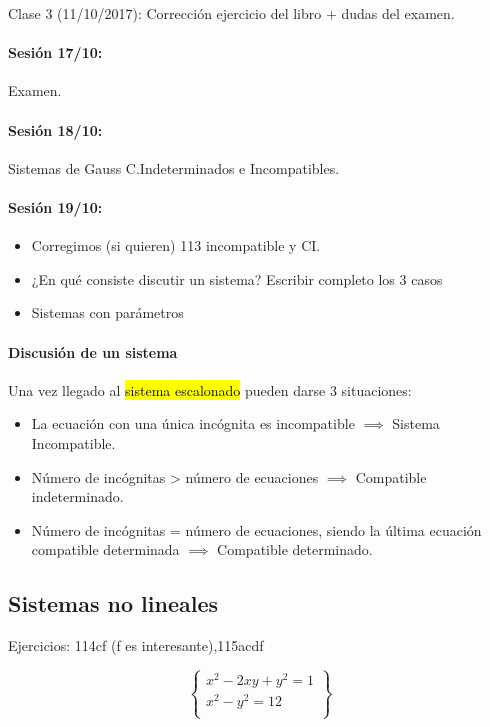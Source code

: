 Clase 3 (11/10/2017): Corrección ejercicio del libro + dudas del examen. 

\paragraph{Sesión 17/10:} Examen.

\paragraph{Sesión 18/10:} Sistemas de Gauss C.Indeterminados e Incompatibles.

\paragraph{Sesión 19/10:} 
\begin{itemize}
	\item Corregimos (si quieren) 113 incompatible y CI.
	\item ¿En qué consiste discutir un sistema? Escribir completo los 3 casos
	\item Sistemas con parámetros
\end{itemize}

\paragraph{Discusión de un sistema}

Una vez llegado al \hl{sistema escalonado} pueden darse 3 situaciones:

\begin{itemize}
	\item La ecuación con una única incógnita es incompatible $\implies$ Sistema Incompatible.
	\item Número de incógnitas > número de ecuaciones $\implies$ Compatible indeterminado.
	\item Número de incógnitas = número de ecuaciones, siendo la última ecuación compatible determinada $\implies$ Compatible determinado.
\end{itemize}


\subsection{Sistemas no lineales}

Ejercicios: 114cf (f es interesante),115acdf

\[
\left\{
	\begin{array}{c}
		x^2-2xy+y^2 = 1\\
		x^2-y^2 = 12\\
	\end{array}
\right\}
\]